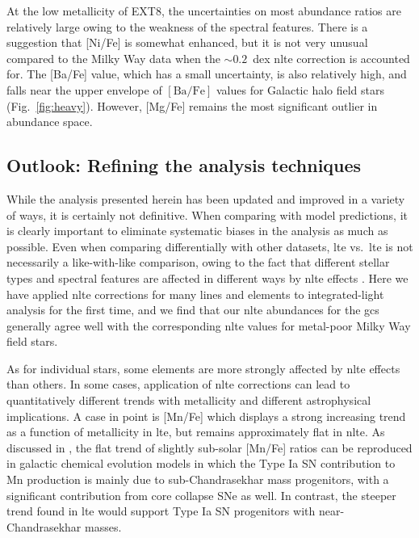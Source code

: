 \documentclass{aa}
\begin{document}
At the low metallicity of EXT8, the uncertainties on most abundance ratios are relatively large owing to the weakness of the spectral features. There is a suggestion that [Ni/Fe] is somewhat enhanced, but it is not very unusual compared to the Milky Way data when the $\sim0.2$~dex \ac{nlte} correction is accounted for. 
The [Ba/Fe] value, which has a small uncertainty, is also relatively high, and falls near the upper envelope of $\mathrm{[Ba/Fe]}$ values for Galactic halo field stars (Fig.~\ref{fig:heavy}). However, [Mg/Fe] remains the most significant outlier in abundance space. 


\subsection{Outlook: Refining the analysis techniques}

While the analysis presented herein has been updated and improved in a variety of ways, it is certainly not definitive. When comparing with model predictions, it is clearly important to eliminate systematic biases in the analysis as much as possible.  Even when comparing differentially with other datasets, \ac{lte} vs.\ \ac{lte} is not necessarily a like-with-like comparison, owing to the fact that different stellar types and spectral features are affected in different ways by \ac{nlte} effects \citep[e.g.][]{Eitner2019}. 
Here we have applied \ac{nlte} corrections for many lines and elements to integrated-light analysis for the first time, and we find that our \ac{nlte} abundances for the \acp{gc} generally agree well with the corresponding \ac{nlte} values for metal-poor Milky Way field stars. 

As for individual stars, some elements are more strongly affected by \ac{nlte} effects than others. In some cases, application of \ac{nlte} corrections can lead to quantitatively different trends with metallicity and different astrophysical implications. A case in point is [Mn/Fe] which displays a strong increasing trend as a function of metallicity in \ac{lte}, but remains approximately flat in \ac{nlte}.  As discussed in \citet{Eitner2020}, the flat trend of slightly sub-solar [Mn/Fe] ratios can be reproduced in galactic chemical evolution models in which the Type Ia SN contribution to Mn production is mainly due to sub-Chandrasekhar mass progenitors, with a significant contribution from core collapse SNe as well. In contrast, the steeper trend found in \ac{lte} would support Type Ia SN progenitors with near-Chandrasekhar masses. 
\end{document}
